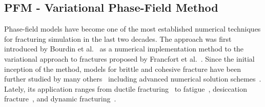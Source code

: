 \subsection{PFM - Variational Phase-Field Method}

Phase-field models have become one of the most established numerical techniques for fracturing simulation in the last two decades. 
The approach was first introduced by Bourdin et al.~\cite{Bourdin2000} as a numerical implementation method to the variational approach to fractures proposed by Francfort et al.~\cite{Francfort1998}. 
Since the initial inception of the method, models for brittle and cohesive fracture have been further studied by many others~\cite{Bourdin2008, Hakim2009, Amor2009,  Kuhn2010, Verhoosel2010,  Pham2011, Vignollet2014,  Ambati2015, Marigo2016, Wu2017, Tanne2018,  Sargado2018} including advanced numerical solution schemes~\cite{Gerasimov2016, Farrell2017}.
Lately, its application ranges from ductile fracturing~\cite{Ambati2015, Miehe2015_thermo,Kuhn2016,Alessi2017} to fatigue~\cite{Alessi2018,Seiler2018}, desiccation fracture~\cite{Maurini2013, Cajuhi2017}, and dynamic fracturing~\cite{Bourdin2011, Borden2012,Hofacker2012, Schluter2014, Li2016}.

